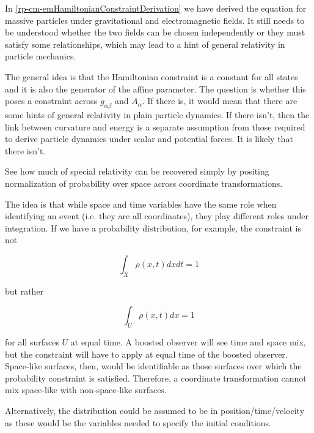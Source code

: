 {In \ref{rp-cm-emHamiltonianConstraintDerivation} we have derived the equation for massive particles under gravitational and electromagnetic fields. It still needs to be understood whether the two fields can be chosen independently or they must satisfy some relationships, which may lead to a hint of general relativity in particle mechanics.}

The general idea is that the Hamiltonian constraint is a constant for all states and it is also the generator of the affine parameter. The question is whether this poses a constraint across $g_{\alpha\beta}$ and $A_\alpha$. If there is, it would mean that there are some hints of general relativity in plain particle dynamics. If there isn’t, then the link between curvature and energy is a separate assumption from those required to derive particle dynamics under scalar and potential forces. It is likely that there isn't.

{See how much of special relativity can be recovered simply by positing normalization of probability over space across coordinate transformations.}

The idea is that while space and time variables have the same role when identifying an event (i.e. they are all coordinates), they play different roles under integration. If we have a probability distribution, for example,
the constraint is not

$$ \int_X \rho(x, t) dx dt = 1 $$

but rather

$$ \int_U \rho(x, t) dx = 1 $$

for all surfaces $U$ at equal time. A boosted observer will see time and space mix, but the constraint will have to apply at equal time of the boosted observer. Space-like surfaces, then, would be identifiable as those surfaces over which the probability constraint is satisfied. Therefore, a coordinate transformation cannot mix space-like with non-space-like surfaces.

Alternatively, the distribution could be assumed to be in position/time/velocity as these would be the variables needed to specify the initial conditions.

